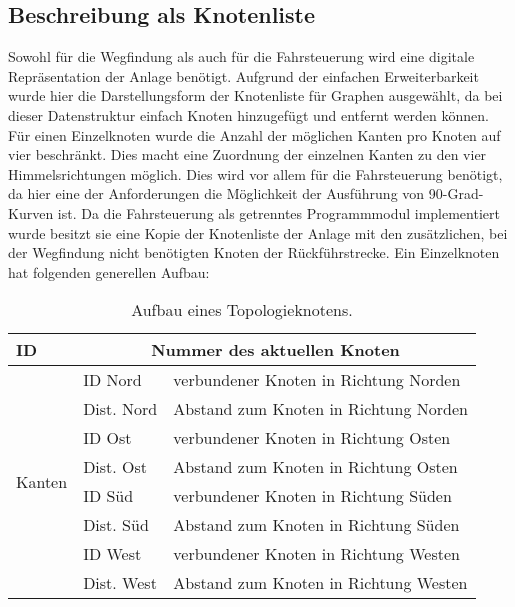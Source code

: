 		\subsection{Beschreibung als Knotenliste}
			\label{Knotenliste}
			Sowohl für die Wegfindung als auch für die Fahrsteuerung wird eine digitale Repräsentation der Anlage benötigt. Aufgrund der einfachen Erweiterbarkeit wurde hier die Darstellungsform der Knotenliste für Graphen ausgewählt, da bei dieser Datenstruktur einfach Knoten hinzugefügt und entfernt werden können. Für einen Einzelknoten wurde die Anzahl der möglichen Kanten pro Knoten auf vier beschränkt. Dies macht eine Zuordnung der einzelnen Kanten zu den vier Himmelsrichtungen möglich. Dies wird vor allem für die Fahrsteuerung benötigt, da hier eine der Anforderungen die Möglichkeit der Ausführung von 90-Grad-Kurven ist. Da die Fahrsteuerung als getrenntes Programmmodul implementiert wurde besitzt sie eine Kopie der Knotenliste der Anlage mit den zusätzlichen, bei der Wegfindung nicht benötigten Knoten der Rückführstrecke.
			Ein Einzelknoten hat folgenden generellen Aufbau:\\
			
			\begin{table}[h]
			
				\begin{tabular}{| l | l | l |}
					
					\hline
					\textbf{ID} &
					\multicolumn{2}{c|}{Nummer des aktuellen Knoten} \\[1pt]
					\hline
					\multirow{8}{*}{Kanten}
						& ID Nord & verbundener Knoten in Richtung Norden \\[1pt] \cline{2-3}
						& Dist. Nord & Abstand zum Knoten in Richtung Norden\\[1pt] \cline{2-3}
						& ID Ost & verbundener Knoten in Richtung Osten \\[1pt] \cline{2-3}
						& Dist. Ost & Abstand zum Knoten in Richtung Osten\\[1pt] \cline{2-3}
						& ID Süd & verbundener Knoten in Richtung Süden\\[1pt] \cline{2-3}
						& Dist. Süd & Abstand zum Knoten in Richtung Süden\\[1pt] \cline{2-3}
						& ID West & verbundener Knoten in Richtung Westen\\[1pt] \cline{2-3}
						& Dist. West & Abstand zum Knoten in Richtung Westen\\[1pt] 
						\hline
				
				\end{tabular}
				\vspace{0.2cm}
				\caption{Aufbau eines Topologieknotens.}
			\end{table}
			
